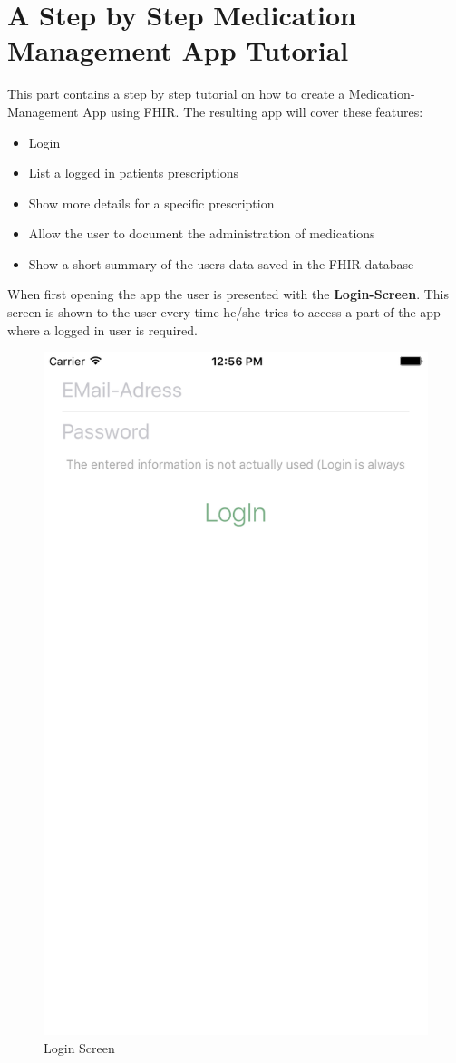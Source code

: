 \documentclass{article}
\begin{document}
\part{A Step by Step Medication Management App Tutorial}
This part contains a step by step tutorial on how to create a Medication-Management App using FHIR.
The resulting app will cover these features:
\begin{itemize}
  \item
    Login
  \item
    List a logged in patients prescriptions
  \item
    Show more details for a specific prescription
  \item
    Allow the user to document the administration of medications
  \item
    Show a short summary of the users data saved in the FHIR-database

\end{itemize}
\pagebreak
When first opening the app the user is presented with the \textbf{Login-Screen}.
This screen is shown to the user every time he/she tries to access a part of the app where a logged in user is required.
\\
\begin{figure}[H]
\centering
\includegraphics[width=0.5\linewidth, frame]{resources/app-screens/01-login.png}
\caption{Login Screen}
\label{fig:app_screen:login}
\end{figure}
\pagebreak
\end{document}
